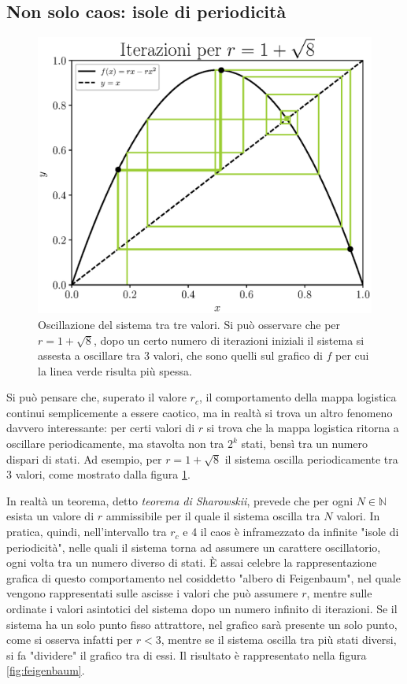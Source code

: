 \subsection{Non solo caos: isole di periodicità}
\begin{figure}[h!]
    \begin{center}  
    \includegraphics[scale=0.6]{Immagini/3_oscillazioni.eps} 
    \captionsetup{width=.8\linewidth}
    \caption{Oscillazione del sistema tra tre valori. Si può osservare che per $r = 1 + \sqrt{8}$, dopo un certo numero di iterazioni iniziali il sistema si assesta a oscillare tra 3 valori, che sono quelli sul grafico di $f$ per cui la linea verde risulta più spessa.}
    \label{fig:tre_osc}
    \end{center}   
\end{figure}
Si può pensare che, superato il valore $r_c$, il comportamento della mappa logistica continui semplicemente a essere caotico, ma in realtà si trova un altro fenomeno davvero interessante: per certi valori di $r$ si trova che la mappa logistica ritorna a oscillare periodicamente, ma stavolta non tra $2^k$ stati, bensì tra un numero dispari di stati. Ad esempio, per $r = 1 + \sqrt{8}$ il sistema oscilla periodicamente tra 3 valori, come mostrato dalla figura \ref{fig:tre_osc}.

In realtà un teorema, detto \textit{teorema di Sharowskii}, prevede che per ogni $N \in \mathbb{N}$ esista un valore di $r$ ammissibile per il quale il sistema oscilla tra $N$ valori. In pratica, quindi, nell'intervallo tra $r_c$ e 4 il caos è inframezzato da infinite "isole di periodicità", nelle quali il sistema torna ad assumere un carattere oscillatorio, ogni volta tra un numero diverso di stati. È assai celebre la rappresentazione grafica di questo comportamento nel cosiddetto "albero di Feigenbaum", nel quale vengono rappresentati sulle ascisse i valori che può assumere $r$, mentre sulle ordinate i valori asintotici del sistema dopo un numero infinito di iterazioni. Se il sistema ha un solo punto fisso attrattore, nel grafico sarà presente un solo punto, come si osserva infatti per $r<3$, mentre se il sistema oscilla tra più stati diversi, si fa "dividere" il grafico tra di essi. Il risultato è rappresentato nella figura \ref{fig:feigenbaum}.

